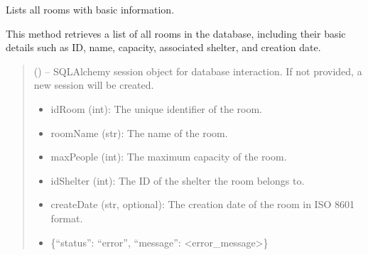\documentclass[letterpaper,10pt,english]{sphinxmanual}
\begin{document}
\begin{fulllineitems}
\begin{fulllineitems}
\label{\detokenize{app.controllers:app.controllers.room_controller.RoomController.list_rooms}}
\pysigstartsignatures
\pysiglinewithargsret
{}
{}
{}
\pysigstopsignatures
\sphinxAtStartPar
Lists all rooms with basic information.

\sphinxAtStartPar
This method retrieves a list of all rooms in the database, including their
basic details such as ID, name, capacity, associated shelter, and creation date.
\begin{quote}\begin{description}
\sphinxAtStartPar
{} (\sphinxstyleliteralemphasis{\sphinxupquote{, }}) – SQLAlchemy session object for database interaction.
If not provided, a new session will be created.

\sphinxAtStartPar
\begin{description}
\begin{itemize}
\item {} 
\sphinxAtStartPar
idRoom (int): The unique identifier of the room.

\item {} 
\sphinxAtStartPar
roomName (str): The name of the room.

\item {} 
\sphinxAtStartPar
maxPeople (int): The maximum capacity of the room.

\item {} 
\sphinxAtStartPar
idShelter (int): The ID of the shelter the room belongs to.

\item {} 
\sphinxAtStartPar
createDate (str, optional): The creation date of the room in ISO 8601 format.

\end{itemize}

\begin{itemize}
\item {} 
\sphinxAtStartPar
\{“status”: “error”, “message”: <error\_message>\}

\end{itemize}


\end{description}
\end{description}
\end{quote}
\end{fulllineitems}
\end{fulllineitems}
\end{document}
